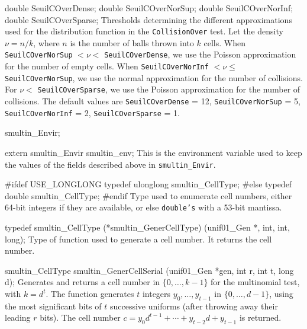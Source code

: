 {   double SeuilCOverDense;
   double SeuilCOverNorSup;
   double SeuilCOverNorInf;
   double SeuilCOverSparse;
\endcode
\tabb
  Thresholds determining the different approximations used for
  the distribution function in the {\tt CollisionOver} test.
  Let the density $\nu = n/k$, where $n$ is
  the number of balls thrown into $k$ cells.
  When {\tt SeuilCOverNorSup} $< \nu < $
  {\tt SeuilCOverDense},
  we use the Poisson approximation for the number of empty cells.
  When {\tt SeuilCOverNorInf} $< \nu \le $ 
  {\tt SeuilCOverNorSup}, we use  the
   normal approximation for the number of collisions.
   For $ \nu < $ {\tt SeuilCOverSparse},  we use  the
   Poisson  approximation  for the number of collisions.
   The  default values are {\tt SeuilCOverDense} = 12,
  {\tt SeuilCOverNorSup} = 5, {\tt SeuilCOverNorInf} = 2,
  {\tt SeuilCOverSparse} = 1.
\endtabb
\fi
\code

} smultin_Envir;


extern smultin_Envir smultin_env;
\endcode
\tab
   This is the environment variable used to keep the values of the fields
   described above in {\tt smultin\_Envir}.
\endtab




\code

#ifdef USE_LONGLONG
   typedef ulonglong smultin_CellType;
#else
   typedef double smultin_CellType;
#endif
\endcode
  \tab Type used to enumerate cell numbers, either 64-bit integers
   if they are available, or else  {\tt double's} with a 53-bit mantissa.
  \endtab
\code


typedef smultin_CellType (*smultin_GenerCellType) (unif01_Gen *, int, int,
                                                   long);
\endcode
  \tab
   Type of function used to generate a cell number. It returns the cell
   number.
  \endtab
\code


smultin_CellType smultin_GenerCellSerial (unif01_Gen *gen, int r, int t,
                                          long d);
\endcode
 \tab  Generates and returns a cell number in $\{0,\dots,k-1\}$ for the 
  multinomial test, with $k = d^t$. The function generates $t$ integers 
  $y_0,\dots,y_{t-1}$ in $\{0,\dots,d-1\}$, using the most significant 
  bits of $t$ successive uniforms 
  (after throwing away their leading $r$ bits).
  The cell number $c = y_0 d^{t-1} + \cdots + y_{t-2} d + y_{t-1}$
  is returned.
 \endtab
\code


